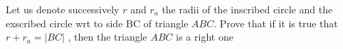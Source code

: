 Let us denote successively $r$ and $r_a$ the radii of the inscribed circle and the exscribed circle wrt to side BC of triangle $ABC$. Prove that if it is true that $r+r_a=|BC|$ , then the triangle $ABC$ is a right one